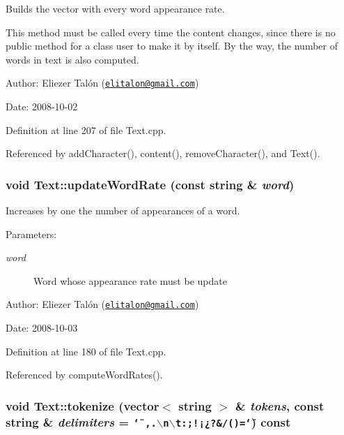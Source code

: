 Builds the vector with every word appearance rate. 

This method must be called every time the content changes, since there is no public method for a class user to make it by itself. By the way, the number of words in text is also computed.

\begin{Desc}
\item[Author:]Eliezer Talón (\href{mailto:elitalon@gmail.com}{\tt elitalon@gmail.com}) \end{Desc}
\begin{Desc}
\item[Date:]2008-10-02 \end{Desc}


Definition at line 207 of file Text.cpp.

Referenced by addCharacter(), content(), removeCharacter(), and Text().\hypertarget{class_text_f6d05ed37e647935127fdf4f36eaca43}{
\subsubsection[updateWordRate]{\setlength{\rightskip}{0pt plus 5cm}void Text::updateWordRate (const string \& {\em word})}}
\label{class_text_f6d05ed37e647935127fdf4f36eaca43}


Increases by one the number of appearances of a word. 

\begin{Desc}
\item[Parameters:]
\begin{description}
\item[{\em word}]Word whose appearance rate must be update\end{description}
\end{Desc}
\begin{Desc}
\item[Author:]Eliezer Talón (\href{mailto:elitalon@gmail.com}{\tt elitalon@gmail.com}) \end{Desc}
\begin{Desc}
\item[Date:]2008-10-03 \end{Desc}


Definition at line 180 of file Text.cpp.

Referenced by computeWordRates().\hypertarget{class_text_09f6b1e475da423ac81305500e05c7d6}{
\subsubsection[tokenize]{\setlength{\rightskip}{0pt plus 5cm}void Text::tokenize (vector$<$ string $>$ \& {\em tokens}, \/  const string \& {\em delimiters} = {\tt \char`\"{}~,.$\backslash$n$\backslash$t:;!¡¿?\&/()=\char`\"{}}) const}}
\label{class_text_09f6b1e475da423ac81305500e05c7d6}


